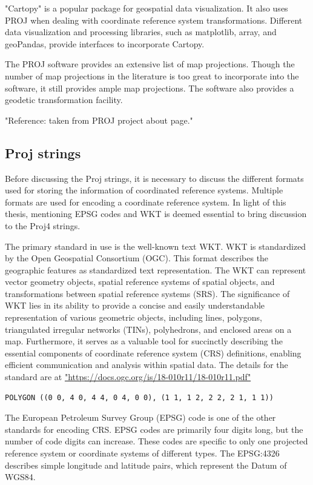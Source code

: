 "Cartopy" is a popular package for geospatial data visualization. It also uses PROJ when dealing with coordinate reference system transformations. Different data visualization and processing libraries, such as matplotlib, array, and geoPandas, provide interfaces to incorporate Cartopy.

The PROJ software provides an extensive list of map projections. Though the number of map projections in the literature is too great to incorporate into the software, it still provides ample map projections. The software also provides a geodetic transformation facility.

"Reference: taken from PROJ project about page."

\subsection{Proj strings}

Before discussing the Proj strings, it is necessary to discuss the different formats used for storing the information of coordinated reference systems. Multiple formats are used for encoding a coordinate reference system. In light of this thesis, mentioning EPSG codes and WKT is deemed essential to bring discussion to the Proj4 strings.

The primary standard in use is the well-known text WKT. WKT is standardized by the Open Geospatial Consortium (OGC). This format describes the geographic features as standardized text representation. The WKT can represent vector geometry objects, spatial reference systems of spatial objects, and transformations between spatial reference systems (SRS). The significance of WKT lies in its ability to provide a concise and easily understandable representation of various geometric objects, including lines, polygons, triangulated irregular networks (TINs), polyhedrons, and enclosed areas on a map. Furthermore, it serves as a valuable tool for succinctly describing the essential components of coordinate reference system (CRS) definitions, enabling efficient communication and analysis within spatial data. The details for the standard are at \url{"https://docs.ogc.org/is/18-010r11/18-010r11.pdf"}
\begin{lstlisting}
POLYGON ((0 0, 4 0, 4 4, 0 4, 0 0), (1 1, 1 2, 2 2, 2 1, 1 1))
\end{lstlisting}
The European Petroleum Survey Group (EPSG) code is one of the other standards for encoding CRS. EPSG codes are primarily four digits long, but the number of code digits can increase. These codes are specific to only one projected reference system or coordinate systems of different types. The EPSG:4326 describes simple longitude and latitude pairs, which represent the Datum of WGS84.

